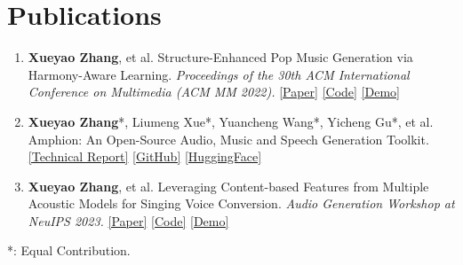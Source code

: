 \documentclass{resume}
\begin{document}




\section{Publications}

\begin{enumerate}\itemsep 0.5em
  \item \textbf{Xueyao Zhang}, et al. Structure-Enhanced Pop Music Generation via Harmony-Aware Learning. \textit{Proceedings of the 30th ACM International Conference on Multimedia (ACM MM 2022).} \href{https://dl.acm.org/doi/10.1145/3503161.3548084}{[Paper]} \href{https://github.com/RMSnow/HAT}{[Code]} \href{https://www.zhangxueyao.com/data/HAT/demo.html}{[Demo]}
  \item \textbf{Xueyao Zhang}*, Liumeng Xue*, Yuancheng Wang*, Yicheng Gu*, et al. Amphion: An Open-Source Audio, Music and Speech Generation Toolkit. \href{https://arxiv.org/pdf/2312.09911.pdf}{[Technical Report]} \href{https://github.com/open-mmlab/Amphion}{[GitHub]} \href{https://huggingface.co/amphion}{[HuggingFace]}
  \item \textbf{Xueyao Zhang}, et al. Leveraging Content-based Features from Multiple Acoustic Models for Singing Voice Conversion. \textit{Audio Generation Workshop at NeuIPS 2023.} \href{https://arxiv.org/pdf/2310.11160.pdf}{[Paper]} \href{https://github.com/open-mmlab/Amphion/tree/main/egs/svc/MultipleContentsSVC}{[Code]} \href{https://www.zhangxueyao.com/data/MultipleContentsSVC/index.html}{[Demo]}
\end{enumerate}
*: Equal Contribution.
\end{document}
